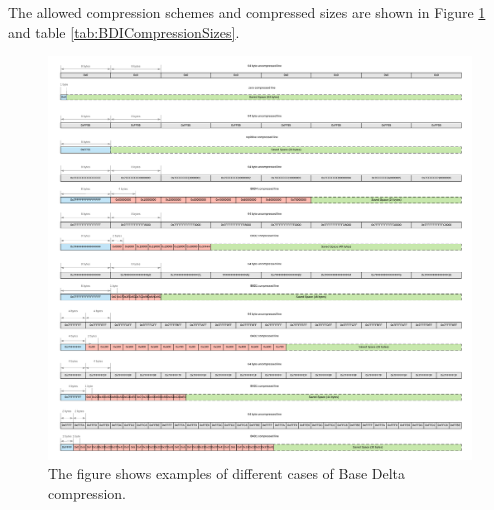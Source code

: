 The allowed compression schemes and compressed sizes are shown in Figure \ref{fig:BaseDeltaCompression} and table \ref{tab:BDICompressionSizes}.
\begin{figure}
    \includegraphics[width=\textwidth]{BaseDeltaCompression.pdf}
    \caption[Base Delta Compression Examples]{The figure shows examples of different cases of Base Delta compression.}
    \label{fig:BaseDeltaCompression}
\end{figure}
